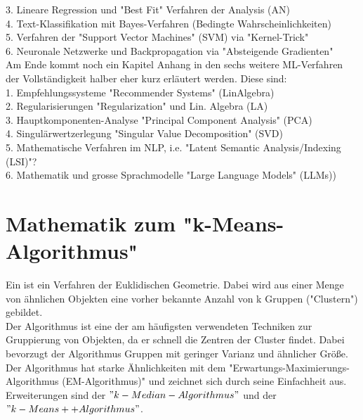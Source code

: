\documentclass[12pt]{article}
\begin{document}
3. Lineare Regression und "Best Fit" Verfahren der Analysis (AN)\\

4. Text-Klassifikation mit Bayes-Verfahren (Bedingte Wahrscheinlichkeiten)\\
 
5. Verfahren der "Support Vector Machines" (SVM) via "Kernel-Trick"\\

6. Neuronale Netzwerke und Backpropagation via "Absteigende Gradienten"\\[0.2cm]
%
Am Ende kommt noch ein Kapitel Anhang in den sechs weitere ML-Verfahren der Vollständigkeit halber eher kurz erläutert werden. Diese sind:\\

1. Empfehlungssysteme "Recommender Systems" (LinAlgebra)\\

2. Regularisierungen "Regularization" und Lin. Algebra (LA)\\

3. Hauptkomponenten-Analyse "Principal Component Analysis" (PCA)\\
 
4. Singulärwertzerlegung "Singular Value Decomposition" (SVD)\\
 
5. Mathematische Verfahren im NLP, i.e. "Latent Semantic Analysis/Indexing (LSI)"?\\

6. Mathematik und grosse Sprachmodelle "Large Language Models" (LLMs))

\newpage

\section{Mathematik zum "k-Means-Algorithmus" \\}

Ein {\color{blue}{k-Means-Algorithmus}} ist ein Verfahren der Euklidischen Geometrie. Dabei wird aus einer Menge von ähnlichen Objekten eine vorher bekannte Anzahl von k Gruppen ("Clustern") gebildet.\\
Der Algorithmus ist eine der am häufigsten verwendeten Techniken zur Gruppierung von Objekten, da er schnell die Zentren der Cluster findet. Dabei bevorzugt der Algorithmus Gruppen mit geringer Varianz und ähnlicher Größe.\\
Der Algorithmus hat starke Ähnlichkeiten mit dem "Erwartungs-Maximierungs-Algorithmus (EM-Algorithmus)" und zeichnet sich durch seine Einfachheit aus.\\
Erweiterungen sind der $"k-Median-Algorithmus"$ und der $"k-Means++ Algorithmus" $.\\
\end{document}
